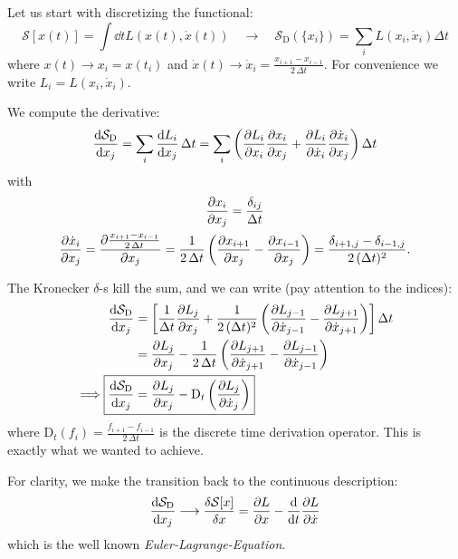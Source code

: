 \documentclass[11pt,a4paper]{scrartcl}
\newcommand{\SD}{\ensuremath{\mathcal{S}_{\mathrm{D}}}}
\newcommand{\xdoti}{\ensuremath{\dot{x}_i}}
\newcommand{\xdotj}{\ensuremath{\dot{x}_j}}
\newcommand{\xdotjm}{\ensuremath{\dot{x}_{j-1}}}
\newcommand{\deltaij}{\ensuremath{\delta_{ij}}}
\newcommand{\OverDeltaT}[1]{\ensuremath{\frac{#1}{\Delta t}}}
\newcommand{\DT}{\ensuremath{\mathrm{D}_t}}
\newcommand{\OverTwoDeltaT}[1]{\ensuremath{\frac{#1}{2\, \Delta t}}}
\newcommand{\xdotjp}{\ensuremath{\dot{x}_{j+1}}}
\begin{document}
Let us start with discretizing the functional:
\begin{equation}
    \mathcal{S}\left[x(t)\right] = \int\dd{t}L\left(x(t), \dot{x}(t)\right)
    \quad\longrightarrow\quad
    \SD\left(\{x_i\}\right) = \sum_i L\left(x_i, \xdoti\right)\Delta t
\end{equation}
where $x(t) \longrightarrow x_i = x(t_i)$ and $\dot{x}(t) \longrightarrow
\xdoti = \OverTwoDeltaT{x_{i+1}-x_{i-1}}$. For convenience we write $L_i = L(x_i, \xdoti)$.

We compute the derivative:
\begin{equation}
    \dv{\SD}{x_j} =\sum_i\dv{L_i}{x_j}\,\Delta t
    =\sum_i\left(\pdv{L_i}{x_i}\pdv{x_i}{x_j}+\pdv{L_i}{\xdoti}\pdv{\xdoti}{x_j}\right)
    \Delta t
\end{equation}
with
\begin{subequations}
\begin{gather}
    \pdv{x_i}{x_j}=\OverDeltaT{\deltaij} \\
    \pdv{\xdoti}{x_j}=\pdv{\OverTwoDeltaT{x_{i+1}-x_{i-1}}}{x_j}
    =\OverTwoDeltaT{1}\left(\pdv{x_{i+1}}{x_j}-\pdv{x_{i-1}}{x_j}\right)
    =\frac{\delta_{i+1,j}-\delta_{i-1,j}}{2\,(\Delta t)^2}.
\end{gather}
\end{subequations}

The Kronecker $\delta$-s kill the sum, and we can write (pay attention to the indices):
\begin{align}
    \dv{\SD}{x_j}&=\left[\OverDeltaT{1}\pdv{L_j}{x_j}+\frac{1}{2\,(\Delta{t})^2}
    \left(\pdv{L_{j-1}}{\xdotjm}-\pdv{L_{j+1}}{\xdotjp}\right)\right]\Delta{t}
    \nonumber \\
    &=\pdv{L_j}{x_j}-\OverTwoDeltaT{1}\left(\pdv{L_{j+1}}{\xdotjp}-\pdv{L_{j-1}}{\xdotjm}\right)
    \nonumber \\
    \implies\Aboxed{\dv{\SD}{x_j}&=\pdv{L_j}{x_j}-\DT\left(\pdv{L_{j}}{\xdotj}\right)}
\end{align}
where $\DT(f_i)=\OverTwoDeltaT{f_{i+1}-f_{i-1}}$ is the discrete time derivation
operator.
This is exactly what we wanted to achieve.

For clarity, we make the transition back to the continuous description:
\begin{equation}
    \dv{\SD}{x_j}\longrightarrow\fdv{\mathcal{S}[x]}{x}=\pdv{L}{x}-\dv{t}\pdv{L}{\dot{x}}
\end{equation}
which is the well known \emph{Euler-Lagrange-Equation}.
\end{document}
